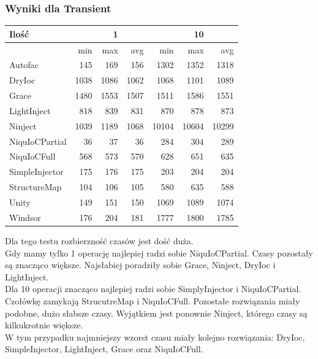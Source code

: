 \documentclass[12pt]{article}
\begin{document}
\subsubsection{Wyniki dla Transient}
\begin{center}
\begin{small}
	\begin{tabular}{ | l | r r r | r r r | }
    		\hline
     		Ilość & & 1 & & & 10 &  \\ \hline
     		 & min & max & avg & min & max & avg \\ \hline
		Autofac & 145 & 169 & 156 & 1302 & 1352 & 1318 \\ \hline
		DryIoc & 1038 & 1086 & 1062 & 1068 & 1101 & 1089 \\ \hline
		Grace & 1480 & 1553 & 1507 & 1511 & 1586 & 1551 \\ \hline
		LightInject & 818 & 839 & 831 & 870 & 878 & 873 \\ \hline
		Ninject & 1039 & 1189 & 1068 & 10104 & 10604 & 10299 \\ \hline
		NiquIoCPartial & 36 & 37 & 36 & 284 & 304 & 289 \\ \hline
		NiquIoCFull & 568 & 573 & 570 & 628 & 651 & 635 \\ \hline
		SimpleInjector & 175 & 176 & 175 & 203 & 204 & 204 \\ \hline
		StructureMap & 104 & 106 & 105 & 580 & 635 & 588 \\ \hline
		Unity & 149 & 151 & 150 & 1069 & 1089 & 1074 \\ \hline
		Windsor & 176 & 204 & 181 & 1777 & 1800 & 1785 \\
    		\hline
  	\end{tabular}
\end{small}
\end{center}
Dla tego testu rozbierzność czasów jest dość duża.\\
Gdy mamy tylko 1 operację najlepiej radzi sobie NiquIoCPartial. Czasy pozostały są znacząco większe. Najsłabiej poradziły sobie Grace, Ninject, DryIoc i LightInject.\\
Dla 10 operacji znacząco najlepiej radzi sobie SimplyInjector i NiquIoCPartial. Czołówkę zamykają StrucutreMap i NiquIoCFull. Pozostałe rozwiązania miały podobne, dużo słabsze czasy. Wyjątkiem jest ponownie Ninject, którego czasy są kilkukrotnie większe.\\
W tym przypadku najmniejszy wzorst czasu miały kolejno rozwiązania: DryIoc, SimpleInjector, LightInject, Grace oraz NiquIoCFull.
\end{document}
